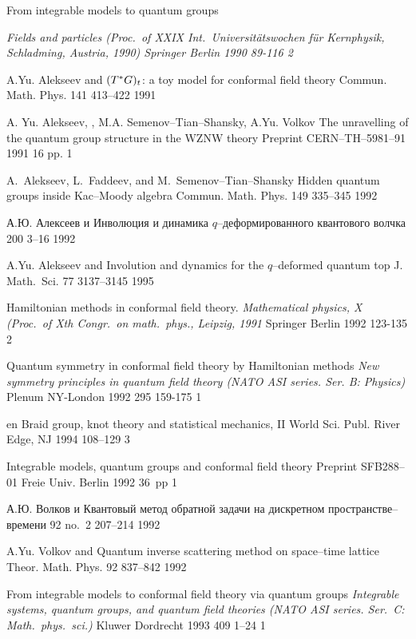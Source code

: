 {\LF}
{From integrable models to quantum groups}
{\em Fields and particles (Proc.\ of XXIX Int.\ Universit\"atswochen f\"ur
 Kernphysik, Schladming, Austria, 1990)
{Springer} {Berlin} {1990} {} {89-116} {2}

{A.Yu. Alekseev and \LF}
{$(T\sp *G)\sb t$: a toy model for conformal field theory}
{Commun. Math. Phys.} {141} {} {413--422} {1991}

{A. Yu. Alekseev, \LF, M.A. Semenov--Tian--Shansky, A.Yu. Volkov} 
{The unravelling of the quantum group structure in the WZNW theory} 
{Preprint CERN--TH--5981--91} {} {} {1991} {} {16 pp.} {1}

{A.~Alekseev, L.~Faddeev, and M.~Semenov--Tian--Shansky}
{Hidden quantum groups inside Kac--Moody algebra}
{Commun. Math. Phys.} {149} {} {335--345} {1992}

{А.Ю. Алексеев и \LD}
{Инволюция и динамика {$q$}--деформированного квантового волчка}
{\Zap} {200} {} {3--16} {1992}

{A.Yu. Alekseev and \LF}
{Involution and dynamics for the {$q$}--deformed quantum top}
{J. Math.\ Sci.} {77} {3137--3145} {1995}

{\LF}
{Hamiltonian methods in conformal field theory.}
{\em Mathematical physics, X (Proc.\ of Xth Congr.\ on math.\ phys.,
 Leipzig, 1991}  {Springer} {Berlin} {1992} {} {123-135} {2} {}

{\LF}
{Quantum symmetry in conformal field theory by Hamiltonian methods}
{\em New symmetry principles in quantum field theory %
(NATO ASI series. Ser. B: Physics)}
{Plenum} {NY-London} {1992} {295} {159-175} {1}

{en}
{Braid group, knot theory and statistical mechanics, II}
{World Sci. Publ.} {River Edge, NJ} {1994} {} {108--129} {3}

{\LF}
{Integrable models, quantum groups and conformal field theory}
{Preprint SFB288--01} {Freie Univ.} {Berlin} {1992} {} {36~pp} {1}

{А.Ю. Волков и \LD}
{Квантовый метод обратной задачи на дискретном пространстве--времени}
{\TMF} {92} {no.~2} {207--214} {1992}

{A.Yu. Volkov and \LF}
{Quantum inverse scattering method on space--time lattice}
{Theor. Math. Phys.} {92} {837--842} {1992}

{\LF}
{From integrable models to conformal field theory via quantum groups}
{\em Integrable systems, quantum groups, and quantum field theories
(NATO ASI series. Ser.~C: Math.\ phys.\ sci.)}
{Kluwer} {Dordrecht} {1993} {409} {} {1--24} {1}

}
